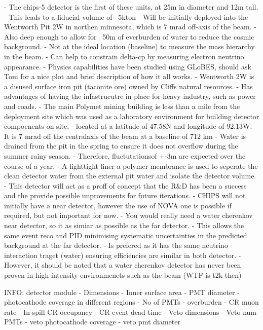 - The chips-5 detector is the first of these units, at 25m in diameter and 12m tall.
- This leads to a fiducial volume of ~5kton
- Will be initially deployed into the Wentworth Pit 2W in northen minnesota, which is 7 mrad
off-axis of the \numi beam.
- Also deep enough to allow for ~50m of everburden of water to reduce the cosmic background.
- Not at the ideal location (baseline) to measure the mass hierarchy in the \numi beam.
- Can help to constrain delta-cp by measuring electron neutrino appearance.
- Physics capabilities have been studied using GLoBES, should ask Tom for a nice plot and brief
description of how it all works.
- Wentworth 2W is a disused surface iron pit (taconite ore) owned by Cliffs natural resources.
- Has advantages of having the infastrucutre in place for heavy industry, such as power and roads.
- The main Polymet mining building is less than a mile from the deployment site which was used as
a laboratory environment for building detector compoenents on site.
- located at a latitude of 47.58N and longitude of 92.13W. It is 7 mrad off the centralaxis of the
\numi beam at a baseline of 712 km
- Water is drained from the pit in the spring to ensure it does not overflow during the summer
rainy season.
- Therefore, fluctutationsof +-3m are expected over the course of a year.
- A lighttight liner a polymer membrance is used to seperate the clean detector water from the
external pit water and isolate the detector volume.
- This detector will act as a proff of concept that the R\&D has been a success and the provide
possible improvements for future iterations.
- CHIPS will not initially have a near detector, however the use of NOVA one is possible if
required, but not important for now.
- You would really need a water cherenkov near detector, so it as simiar as possible as the far
detector.
- This allows the same event reco and PID minimising systematic uncertainties in the predicted
background at the far detector.
- Is prefered as it has the same neutrino interaction traget (water) ensuring efficiencies are
similar in both detector.
- However, it should be noted that a water cherenkov detector has never been proven in high
intensity environmenets such as the \numi beam (WTF is t2k then)

INFO: detector module
- Dimensions
- Inner surface area
- PMT diameter
- photocathode coverage in different regions
- No of PMTs
- overburden
- CR muon rate
- In-spill CR occupancy
- CR event dead time
- Veto dimensions
- Veto num PMTs
- veto photocathode coverage
- veto pmt diameter

